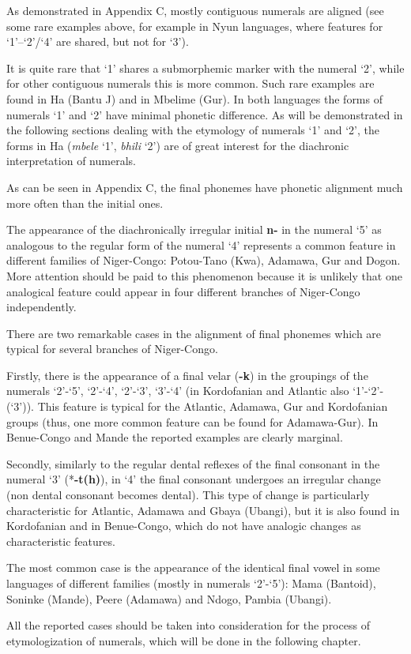 As demonstrated in Appendix C, mostly contiguous numerals are aligned (see some rare examples above, for example in Nyun languages, where features for ‘1’–‘2’/‘4’ are shared, but not for `3'). 

It is quite rare that ‘1’ shares a submorphemic marker with the numeral ‘2’, while for other contiguous numerals this is more common.  Such rare examples are found in Ha (Bantu J) and in Mbelime (Gur). In both languages the forms of numerals ‘1’ and ‘2’ have minimal phonetic difference. As will be demonstrated in the following sections dealing with the etymology of numerals ‘1’ and ‘2’, the forms in Ha (\textit{mbele} ‘1’, \textit{bhili} ‘2’) are of great interest for the diachronic interpretation of numerals.

As can be seen in Appendix C, the final phonemes have phonetic alignment much more often than the initial ones. 

The appearance of the diachronically irregular initial \textbf{n-} in the numeral ‘5’ as analogous to the regular form of the numeral ‘4’ represents a common feature in different families of Niger-Congo: Potou-Tano (Kwa), Adamawa, Gur and Dogon. More attention should be paid to this phenomenon because it is unlikely that one analogical feature could appear in four different branches of Niger-Congo independently. 

There are two remarkable cases in the alignment of final phonemes which are typical for several branches of Niger-Congo. 

Firstly, there is the appearance of a final velar (\textbf{-k}) in the groupings of the numerals ‘2’-‘5’, ‘2’-‘4’, ‘2’-‘3’, ‘3’-‘4’ (in Kordofanian and Atlantic also ‘1’-‘2’-(‘3’)).  This feature is typical for the Atlantic, Adamawa, Gur and Kordofanian groups (thus, one more common feature can be found for Adamawa-Gur). In Benue-Congo and Mande the reported examples are clearly marginal. 

Secondly, similarly to the regular dental reflexes of the final consonant in the numeral ‘3’ (*\textbf{-t(h)}), in ‘4’ the final consonant undergoes an irregular change (non dental consonant becomes dental). This type of change is particularly characteristic for Atlantic, Adamawa and Gbaya (Ubangi), but it is also found in Kordofanian and in Benue-Congo, which do not have analogic changes as characteristic features. 

The most common case is the appearance of the identical final vowel in some languages of different families (mostly in numerals ‘2’-‘5’): Mama (Bantoid), Soninke (Mande), Peere (Adamawa) and Ndogo, Pambia (Ubangi).

All the reported cases should be taken into consideration for the process of etymologization of numerals, which will be done in the following chapter. 


